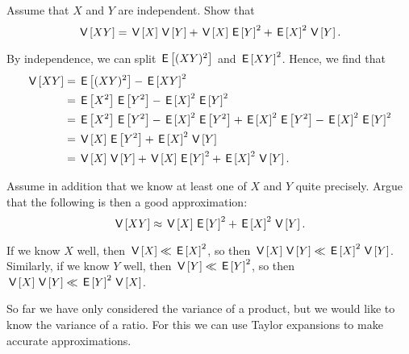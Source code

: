 \documentclass[assignments]{subfiles}
\begin{document}
\begin{exercise} Assume that $X$ and $Y$ are independent. Show that
\begin{equation*}
\V {XY} = \V {X} \V {Y} + \V{X} \E {Y}^2 + \E {X}^2 \V{Y}.
\end{equation*}
\begin{solution}
By independence, we can split $ \E {(XY)^2}$ and $\E {XY}^2$. Hence, we find that
\begin{align*}
\V {XY} &= \E {(XY)^2} - \E {XY}^2 \\ &=  \E {X^2} \E {Y^2}  - \E {X}^2 \E {Y}^2
\\ &=  \E {X^2} \E {Y^2}  - \E {X}^2 \E {Y^2} + \E {X}^2 \E {Y^2} - \E {X}^2 \E {Y}^2
\\ &= \V {X} \E {Y^2} + \E {X}^2 \V{Y}
\\ &= \V {X} \V {Y} + \V{X} \E {Y}^2 + \E {X}^2 \V{Y}.
\end{align*}
\end{solution}
\end{exercise}

\begin{exercise} \label{ex:beluga5}
Assume in addition that we know at least one of $X$ and $Y$ quite precisely. Argue that the following is then a good approximation:
\begin{equation*}
\V {XY} \approx \V{X} \E {Y}^2 + \E {X}^2 \V{Y}.
\end{equation*}
\begin{solution}
If we know $X$ well, then $\V X \ll \E {X}^2$, so then  $\V X \V{Y} \ll  \E {X}^2 \V{Y}$. Similarly, if we know $Y$ well, then $\V Y \ll \E {Y}^2$, so then  $\V X \V{Y} \ll  \E {Y}^2 \V{X}$.
\end{solution}
\end{exercise}


So far we have only considered the variance of a product, but we would like to know the variance of a ratio.
For this we can use Taylor expansions to  make accurate approximations.
\end{document}
